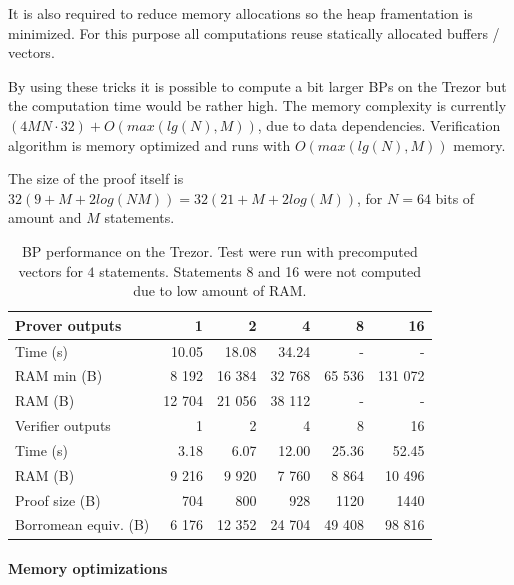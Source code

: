 \documentclass[]{article}
\begin{document}
It is also required to reduce memory allocations so the heap framentation is minimized. For this purpose all computations reuse statically allocated buffers / vectors.

By using these tricks it is possible to compute a bit larger BPs on the Trezor but the computation time would be rather high. The memory complexity is currently $(4MN \cdot 32) + O(max(lg(N), M))$, due to data dependencies. Verification algorithm is memory optimized and runs with $O(max(lg(N), M))$ memory.

The size of the proof itself is $32(9 + M + 2log(NM)) = 32(21 + M + 2log(M))$, for $N=64$ bits of amount and $M$ statements. 

\begin{table}[H]
	\caption{BP performance on the Trezor. Test were run with precomputed vectors for $4$ statements. Statements 8 and 16 were not computed due to low amount of RAM.}\label{tbl:bpperf}	
	\begin{center}
	\begin{tabular}{p{3.5cm} rrrrr}
		\hline
		Prover outputs       & 1         & 2       & 4      & 8      & 16      \\ \hline
		Time (s)             & 10.05     & 18.08   & 34.24  &      - &       - \\
		RAM min (B)          & 8 192     & 16 384  & 32 768 & 65 536 & 131 072 \\
		RAM (B)              & 12 704    & 21 056  & 38 112 &      - &       - \\
		\hline\hline
		
		Verifier outputs  & 1         & 2       & 4      & 8      & 16     \\ \hline
		Time (s)          & 3.18      & 6.07    & 12.00  & 25.36  & 52.45  \\
		RAM (B)           & 9 216     & 9 920   & 7 760  & 8 864  & 10 496 \\ \hline
		
		Proof size (B)       & 704       & 800     & 928    & 1120   & 1440    \\
		Borromean equiv. (B) & 6 176     & 12 352  & 24 704 & 49 408 & 98 816  \\ \hline
		
	\end{tabular}
	\end{center}
\end{table}

\paragraph{Memory optimizations}
\end{document}
